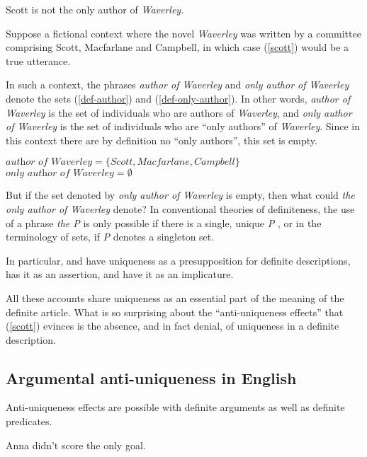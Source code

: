 \documentclass{article}
\begin{document}
\begin{exe}
	 Scott is not the only author of \textit{Waverley}.
\end{exe}

Suppose a fictional context where the novel \textit{Waverley} was written by a committee comprising Scott, Macfarlane and Campbell, in which case (\ref{scott}) would be a true utterance.

In such a context, the phrases \textit{author of Waverley} and \textit{only author of Waverley} denote the sets (\ref{def-author}) and (\ref{def-only-author}). In other words, \textit{author of Waverley} is the set of individuals who are authors of \textit{Waverley}, and \textit{only author of Waverley} is the set of individuals who are ``only authors'' of \textit{Waverley}. Since in this context there are by definition no ``only authors'', this set is empty.

\begin{exe}
	\ex \label{def-author} $\textit{author of Waverley} = \lbrace Scott, Macfarlane, Campbell \rbrace$
	\ex \label{def-only-author} $\textit{only author of Waverley} = \emptyset$
\end{exe}

But if the set denoted by \textit{only author of Waverley} is empty, then what could \textit{the only author of Waverley} denote? In conventional theories of definiteness, the use of a phrase \textit{the P} is only possible if there is a single, unique \textit{P} \citep{horn-abbott-2012}, or in the terminology of sets, if \textit{P} denotes a singleton set.

In particular, \citet{frege} and \citet{strawson50} have uniqueness as a presupposition for definite descriptions, \citet{russell} has it as an assertion, and \citet{horn-abbott-2012} have it as an implicature.

All these accounts share uniqueness as an essential part of the meaning of the definite article. What is so surprising about the ``anti-uniqueness effects'' that (\ref{scott}) evinces is the absence, and in fact denial, of uniqueness in a definite description.

\subsection{Argumental anti-uniqueness in English}
Anti-uniqueness effects are possible with definite arguments as well as definite predicates.

\begin{exe}
	\ex \label{only-goal} Anna didn't score the only goal.
\end{exe}
\end{document}
